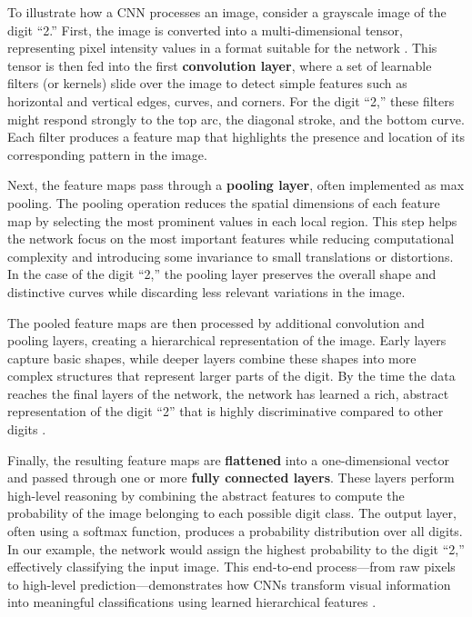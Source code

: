 To illustrate how a CNN processes an image, consider a grayscale image of the digit “2.” First, the image is converted into a multi-dimensional tensor, representing pixel intensity values in a format suitable for the network \cite{goodfellow2016deep}. This tensor is then fed into the first \textbf{convolution layer}, where a set of learnable filters (or kernels) slide over the image to detect simple features such as horizontal and vertical edges, curves, and corners. For the digit “2,” these filters might respond strongly to the top arc, the diagonal stroke, and the bottom curve. Each filter produces a feature map that highlights the presence and location of its corresponding pattern in the image.

Next, the feature maps pass through a \textbf{pooling layer}, often implemented as max pooling. The pooling operation reduces the spatial dimensions of each feature map by selecting the most prominent values in each local region. This step helps the network focus on the most important features while reducing computational complexity and introducing some invariance to small translations or distortions. In the case of the digit “2,” the pooling layer preserves the overall shape and distinctive curves while discarding less relevant variations in the image.

The pooled feature maps are then processed by additional convolution and pooling layers, creating a hierarchical representation of the image. Early layers capture basic shapes, while deeper layers combine these shapes into more complex structures that represent larger parts of the digit. By the time the data reaches the final layers of the network, the network has learned a rich, abstract representation of the digit “2” that is highly discriminative compared to other digits \cite{simonyan2014very}.

Finally, the resulting feature maps are \textbf{flattened} into a one-dimensional vector and passed through one or more \textbf{fully connected layers}. These layers perform high-level reasoning by combining the abstract features to compute the probability of the image belonging to each possible digit class. The output layer, often using a softmax function, produces a probability distribution over all digits. In our example, the network would assign the highest probability to the digit “2,” effectively classifying the input image. This end-to-end process—from raw pixels to high-level prediction—demonstrates how CNNs transform visual information into meaningful classifications using learned hierarchical features \cite{lecun1998gradient, krizhevsky2012imagenet}.

